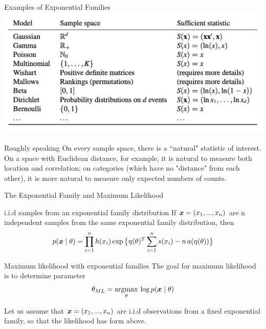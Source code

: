 \documentclass[10pt]{beamer}
\begin{document}
\begin{frame}{Examples of Exponential Families}
\includegraphics[width=\textwidth]{images/ef_examples}

\begin{sblock}{Roughly speaking}
On every sample space, there is a ``natural" statistic of interest. On a space with Euclidean distance, for example, it is natural to measure both location and correlation; on categories (which have no "distance" from each other), it is more natural to measure only expected numbers of counts. %
\end{sblock}



\end{frame}



\begin{frame}{The Exponential Family and Maximum Likelihood}
\begin{sblock}{i.i.d samples from an exponential family distribution}
If ${\boldsymbol x}=(x_1, ..., x_n)$ are n independent samples from the same exponential family distribution, then 
\begin{align*}
 p({\boldsymbol x} \; | \; \theta) = \displaystyle\prod_{i=1}^n h(x_i) \exp \big\{ \eta(\theta)^T \sum_{i=1}^n s(x_i) - n \,a(\eta(\theta))\big\} 
 \end{align*}
 \end{sblock}
 
 \begin{sblock}{Maximum likelihood with exponential families}
 The goal for maximum likelihood is to determine parameter
\begin{equation*}
\theta_{ML} = \operatorname*{argmax}_\theta  \, \log p({\boldsymbol x} \; | \; \theta) 
\end{equation*}

Let us assume that ${\boldsymbol x}=(x_1, ..., x_n)$ are i.i.d observations  from a fixed exponential family, so that the likelihood has form above.
\end{sblock}
\end{frame}
\end{document}
